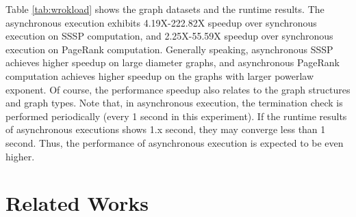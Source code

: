 Table \ref{tab:wrokload} shows the graph datasets and the runtime results. The asynchronous execution exhibits 4.19X-222.82X speedup over synchronous execution on SSSP computation, and 2.25X-55.59X speedup over synchronous execution on PageRank computation. Generally speaking, asynchronous SSSP achieves higher speedup on large diameter graphs, and asynchronous PageRank computation achieves higher speedup on the graphs with larger powerlaw exponent. Of course, the performance speedup also relates to the graph structures and graph types. Note that, in asynchronous execution, the termination check is performed periodically (every 1 second in this experiment). If the runtime results of asynchronous executions shows 1.x second, they may converge less than 1 second. Thus, the performance of asynchronous execution is expected to be even higher.

\section{Related Works}
\label{sec:related}




